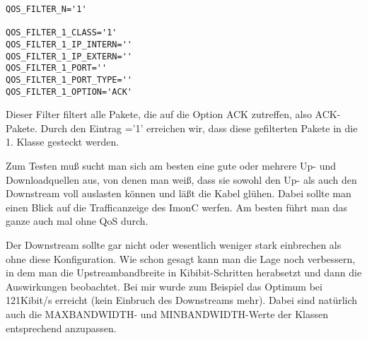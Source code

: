 \begin{small}
\begin{example}
\begin{verbatim}
QOS_FILTER_N='1'

QOS_FILTER_1_CLASS='1'
QOS_FILTER_1_IP_INTERN=''
QOS_FILTER_1_IP_EXTERN=''
QOS_FILTER_1_PORT=''
QOS_FILTER_1_PORT_TYPE=''
QOS_FILTER_1_OPTION='ACK'
\end{verbatim}
\end{example}
\end{small}

   Dieser Filter filtert alle Pakete, die auf die Option ACK zutreffen,
   also ACK-Pakete. Durch den Eintrag ='1' erreichen
   wir, dass diese gefilterten Pakete in die 1. Klasse gesteckt werden.

   Zum Testen muß sucht man sich am besten eine gute oder mehrere Up- und
   Downloadquellen aus, von denen man weiß, dass sie sowohl den Up- als
   auch den Downstream voll auslasten können und läßt die Kabel glühen.
   Dabei sollte man einen Blick auf die Trafficanzeige des ImonC werfen.
   Am besten führt man das ganze auch mal ohne QoS durch.

   Der Downstream sollte gar nicht oder wesentlich weniger stark
   einbrechen als ohne diese Konfiguration. Wie schon gesagt kann man die
   Lage noch verbessern, in dem man die Upstreambandbreite in
   Kibibit-Schritten herabsetzt und dann die Auswirkungen beobachtet.
   Bei mir wurde zum Beispiel das Optimum bei 121Kibit/s erreicht (kein
   Einbruch des Downstreams mehr). Dabei sind natürlich auch die
   MAXBANDWIDTH- und MINBANDWIDTH-Werte der Klassen entsprechend
   anzupassen.

